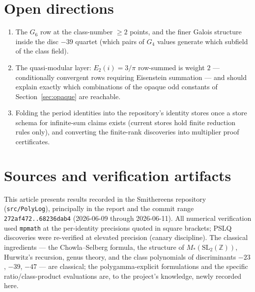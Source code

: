 \documentclass[11pt]{article}
\theoremstyle{remark}
\begin{document}
\section{Open directions}\label{sec:open}

\begin{enumerate}
\item The $G_6$ row at the class-number $\ge2$ points, and the finer Galois structure inside
the disc $-39$ quartet (which pairs of $G_4$ values generate which subfield of the class
field).
\item The quasi-modular layer: $E_2(i)=3/\pi$ row-summed is weight $2$ --- conditionally
convergent rows requiring Eisenstein summation --- and should explain exactly which
combinations of the opaque odd constants of Section~\ref{sec:opaque} are reachable.
\item Folding the period identities into the repository's identity stores once a store schema
for infinite-sum claims exists (current stores hold finite reduction rules only), and
converting the finite-rank discoveries into multiplier proof certificates.
\end{enumerate}

\section*{Sources and verification artifacts}

This article presents results recorded in the Smithereens repository
(\texttt{src/PolyLog}), principally in the report
 and the
commit range \texttt{272af472..68236dab4} (2026-06-09 through 2026-06-11). All numerical
verification used \texttt{mpmath} at the per-identity precisions quoted in square brackets;
PSLQ discoveries were re-verified at elevated precision (canary discipline). The classical
ingredients --- the Chowla--Selberg formula, the structure of $M_*(\mathrm{SL}_2(\mathbb{Z}))$,
Hurwitz's recursion, genus theory, and the class polynomials of discriminants $-23$, $-39$,
$-47$ --- are classical; the polygamma-explicit formulations and the specific
ratio/class-product evaluations are, to the project's knowledge, newly recorded here.
\end{document}

